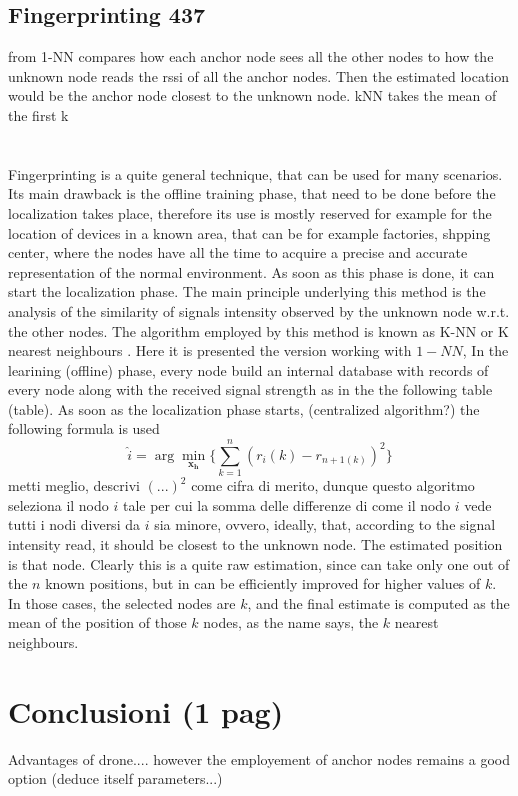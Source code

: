 \documentclass[12pt,twoside]{report}
\begin{document}
\section{Fingerprinting 437}
from \cite{YIU2017235} 1-NN compares how each anchor node sees all the other nodes to how the unknown node reads the rssi of all the anchor nodes. Then the estimated location would be the anchor node closest to the unknown node. kNN takes the mean of the first k\\\\\\
Fingerprinting is a quite general technique, that can be used for many scenarios. Its main drawback is the offline training phase, that need to be done before the localization takes place, therefore its use is mostly reserved for example for the location of devices in a known area, that can be for example factories, shpping center, where the nodes have all the time to acquire a precise and accurate representation of the normal environment. As soon as this phase is done, it can start the localization phase. The main principle underlying this method is the analysis of the similarity of signals intensity observed by the unknown node w.r.t. the other nodes. The algorithm employed by this method is known as K-NN or K nearest neighbours \cite{10.5555/1162264}. Here it is presented the version working with $1-NN$, 
In the learining (offline) phase, every node build an internal database with records of every node along with the received signal strength as in the the following table (table). As soon as the localization phase starts, (centralized algorithm?) the following formula is used
\begin{equation}
    \hat{i}=\arg \min_{\mathbf{x_h}}\bigg\{\sum_{k=1}^n(r_i(k)-r_{n+1(k)})^2\bigg\}
\end{equation}
metti meglio, descrivi $(...)^2$ come cifra di merito,
dunque questo algoritmo seleziona il nodo $i$ tale per cui la somma delle differenze di come il nodo $i$ vede tutti i nodi diversi da $i$ sia minore, ovvero, ideally, that, according to the signal intensity read, it should be closest to the unknown node. The estimated position is that node. Clearly this is a quite raw estimation, since can take only one out of the $n$ known positions, but in can be efficiently improved for higher values of $k$. In those cases, the selected nodes are $k$, and the final estimate is computed as the mean of the position of those $k$ nodes, as the name says, the $k$ nearest neighbours.  


\chapter{Conclusioni (1 pag)}
Advantages of drone.... however the employement of anchor nodes remains a good option (deduce itself parameters...)
\end{document}
